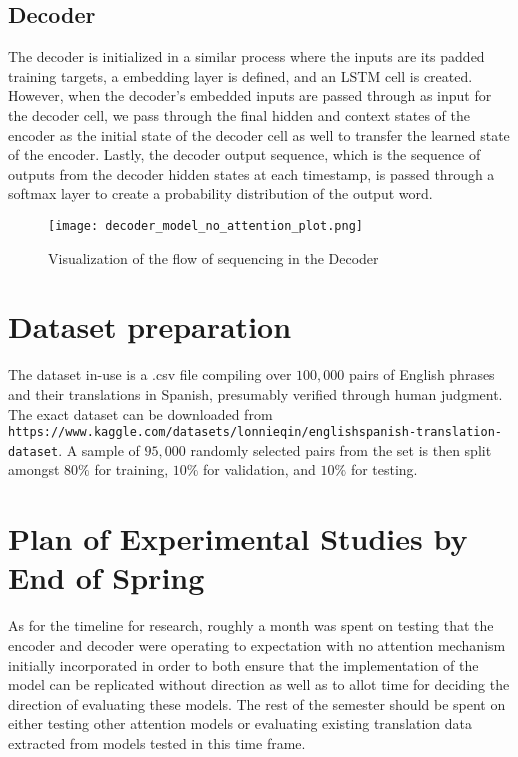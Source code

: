 \documentclass[conference]{IEEEtran}
\begin{document}
\subsection{Decoder}
The decoder is initialized in a similar process where the inputs are its padded training targets, a embedding layer is defined, and an LSTM cell is created. However, when the decoder's embedded inputs are passed through as input for the decoder cell, we pass through the final hidden and context states of the encoder as the initial state of the decoder cell as well to transfer the learned state of the encoder. Lastly, the decoder output sequence, which is the sequence of outputs from the decoder hidden states at each timestamp, is passed through a softmax layer to create a probability distribution of the output word. 
\begin{figure}[h]
\centering
\texttt{[image: decoder\_model\_no\_attention\_plot.png]}
\caption{Visualization of the flow of sequencing in the Decoder}
\end{figure}

\section{Dataset preparation}
The dataset in-use is a .csv file compiling over $100,000$ pairs of English phrases and their translations in Spanish, presumably verified through human judgment. The exact dataset can be downloaded from \nolinkurl{https://www.kaggle.com/datasets/lonnieqin/englishspanish-translation-dataset}. A sample of $95,000$ randomly selected pairs from the set is then split amongst $80\%$ for training, $10\%$ for validation, and $10\%$ for testing.
\section{Plan of Experimental Studies by End of Spring}
As for the timeline for research, roughly a month was spent on testing that the encoder and decoder were operating to expectation with no attention mechanism initially incorporated in order to both ensure that the implementation of the model can be replicated without direction as well as to allot time for deciding the direction of evaluating these models. The rest of the semester should be spent on either testing other attention models or evaluating existing translation data extracted from models tested in this time frame.
\end{document}
